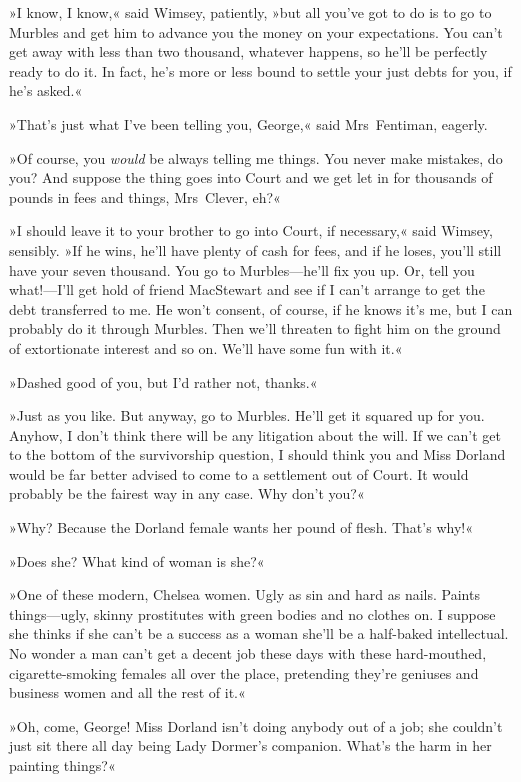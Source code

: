 »I know, I know,« said Wimsey, patiently, »but all you've got to do is to go to Murbles and get him to advance you the money on your expectations. You can't get away with less than two thousand, whatever happens, so he'll be perfectly ready to do it. In fact, he's more or less bound to settle your just debts for you, if he's asked.«

»That's just what I've been telling you, George,« said Mrs~Fentiman, eagerly.

»Of course, you \textit{would} be always telling me things. You never make mistakes, do you? And suppose the thing goes into Court and we get let in for thousands of pounds in fees and things, Mrs~Clever, eh?«

»I should leave it to your brother to go into Court, if necessary,« said Wimsey, sensibly. »If he wins, he'll have plenty of cash for fees, and if he loses, you'll still have your seven thousand. You go to Murbles—he'll fix you up. Or, tell you what!—I'll get hold of friend MacStewart and see if I can't arrange to get the debt transferred to me. He won't consent, of course, if he knows it's me, but I can probably do it through Murbles. Then we'll threaten to fight him on the ground of extortionate interest and so on. We'll have some fun with it.«

»Dashed good of you, but I'd rather not, thanks.«

»Just as you like. But anyway, go to Murbles. He'll get it squared up for you. Anyhow, I don't think there will be any litigation about the will. If we can't get to the bottom of the survivorship question, I should think you and Miss Dorland would be far better advised to come to a settlement out of Court. It would probably be the fairest way in any case. Why don't you?«

»Why? Because the Dorland female wants her pound of flesh. That's why!«

»Does she? What kind of woman is she?«

»One of these modern, Chelsea women. Ugly as sin and hard as nails. Paints things—ugly, skinny prostitutes with green bodies and no clothes on. I suppose she thinks if she can't be a success as a woman she'll be a half-baked intellectual. No wonder a man can't get a decent job these days with these hard-mouthed, cigarette-smoking females all over the place, pretending they're geniuses and business women and all the rest of it.«

»Oh, come, George! Miss Dorland isn't doing anybody out of a job; she couldn't just sit there all day being Lady Dormer's companion. What's the harm in her painting things?«

